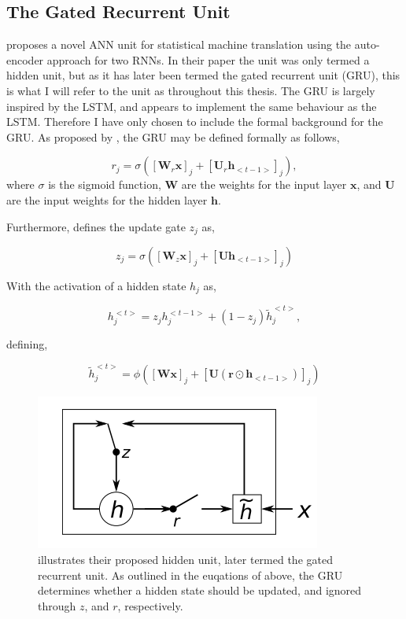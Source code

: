 \subsection{The Gated Recurrent Unit}\label{GRU}

\cite{Cho2014} proposes a novel ANN unit for statistical machine translation using the auto-encoder approach for two RNNs. In their paper the unit was only termed a hidden unit, but as it has later been termed the gated recurrent unit (GRU), this is what I will refer to the unit as throughout this thesis. The GRU is largely inspired by the LSTM, and appears to implement the same behaviour as the LSTM. Therefore I have only chosen to include the formal background for the GRU. As proposed by \cite{Cho2014}, the GRU may be defined formally as follows,

\begin{equation}
    r_j = \sigma ([\textbf{W}_r \textbf{x}]_j + [\textbf{U}_r\textbf{h}_{<t-1>}]_j), 
\end{equation}
where $\sigma$ is the sigmoid function, $\textbf{W}$ are the weights for the input layer $\textbf{x}$, and $\textbf{U}$ are the input weights for the hidden layer $\textbf{h}$.

Furthermore, \cite{Cho2014} defines the update gate $z_j$ as,

\begin{equation}
    z_j = \sigma([\textbf{W}_z\textbf{x}]_j + [\textbf{U}\textbf{h}_{<t-1>}]_j)
\end{equation}
 
With the activation of a hidden state $h_j$ as,
 
\begin{equation}
    h_j^{<t>} = z_j h_j^{<t-1>} + (1 - z_j) \tilde{h}_j^{<t>},
\end{equation}
 
defining,
 
\begin{equation}
    \tilde{h}_j^{<t>} = \phi ([\textbf{W}\textbf{x}]_j + [\textbf{U}(\textbf{r} \odot \textbf{h}_{<t-1>})]_j)
\end{equation}

\begin{figure}
\centering
\includegraphics{fig/cho_gru}
\caption{\cite{Cho2014} illustrates their proposed hidden unit, later termed the gated recurrent unit. As outlined in the euqations of \cite{Cho2014} above, the GRU determines whether a hidden state should be updated, and ignored through $z$, and $r$, respectively.}
\label{fig:cho_gru}
\end{figure}


